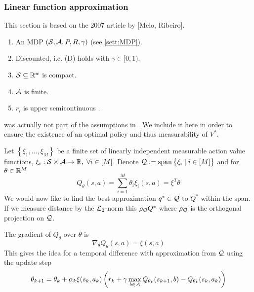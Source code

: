 \subsubsection{Linear function approximation}

This section is based on the 2007 article by [Melo, Ribeiro].

\begin{sett}
  \leavevmode
  \begin{enumerate}
    \item An MDP $(\mathcal{S}, \mathcal{A}, P, R, \gamma)$ (see \cref{sett:MDP}).
    \item Discounted, i.e. (D) holds with $\gamma \in [0,1)$.
    \item $\mathcal{S} \subseteq \mathbb{R}^w$ is compact.
    \item $\mathcal{A}$ is finite.
    \item $r_i$ is upper semicontinuous \label{item:MRlast}.
  \end{enumerate}
  \label{sett:MR}
\end{sett}

\begin{rem}
   was actually not part of the assumptions in
  \citet{Nobody06}.
  We include it here in order to ensure the existence of an
  optimal policy and thus measurability of $V^*$.
\end{rem}

Let $\left\{ \xi_1, \dots, \xi_M \right\}$ be a finite set of linearly
independent measurable action value functions,
$\xi_i : \mathcal{S} \times \mathcal{A} \to \mathbb{R},\; \forall i \in [M]$.
Denote $\mathcal{Q} \vcentcolon= \mathrm{span}\left\{ \xi_i \mid i \in [M] \right\}$
and for $\theta \in \mathbb{R}^M$
\[ Q_\theta(s, a) = \sum_{i=1}^M \theta_i \xi_i(s, a) = \xi^T \theta \]
We would now like to find the best approximation
$q^* \in \mathcal{Q}$ to $Q^*$ within the span.
If we measure distance by the $\mathcal{L}_2$-norm this
$\rho_\mathcal{Q} Q^*$ where $\rho_\mathcal{Q}$ is the orthogonal projection on
$\mathcal{Q}$.

The gradient of $Q_\theta$ over $\theta$ is
\[ \nabla_\theta Q_\theta(s, a) = \xi(s, a) \]
This gives the idea for a temporal difference with approximation from
$\mathcal{Q}$ using the update step
\[ \theta_{k+1} = \theta_k + \alpha_k \xi(s_k, a_k)
  \left( r_k + \gamma \max_{b \in \mathcal{A}} Q_{\theta_k}(s_{k+1}, b)
- Q_{\theta_k}(s_k, a_k) \right) \]

